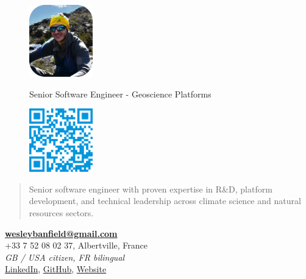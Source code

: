 \documentclass[]{friggeri-cv}
\begin{document}
\begin{figure}[!h]
	\begin{minipage}{0.48\textwidth}
		\begin{flushleft}
			\includegraphics[width=2.75cm]{img/profile_relaxed_compressed.png}
		\end{flushleft}
	\end{minipage}\hfill
 	{Senior Software Engineer - Geoscience Platforms}
	\begin{minipage}{0.48\textwidth}
		\begin{flushright}
			\includegraphics[width=2.75cm]{img/qrcode.png}
		\end{flushright}
	\end{minipage}
\end{figure}
\vspace{-0.75cm}

\begin{quote}
\large
\begin{center}
Senior software engineer with proven expertise in R\&D, platform development, and technical leadership across climate science and natural resources sectors.
\\
\end{center}
\end{quote}

\begin{center}
\vspace{6pt}
\href{mailto:wesleybanfield@gmail.com}{\textbf{wesleybanfield@gmail.com}}
\vspace{3pt}
\\+33 7 52 08 02 37, Albertville, France
\vspace{3pt}
\\\emph{GB / USA citizen, FR bilingual}
\vspace{3pt}
\\\href{https://www.linkedin.com/in/wesleybanfield/}{LinkedIn},
\href{https://github.com/WesleyTheGeolien}{GitHub},
\href{https://wesleythegeolien.github.io}{Website}
\end{center}
\end{document}

